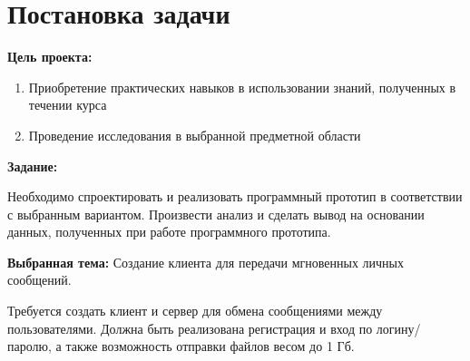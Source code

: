 \section{Постановка задачи}

{\bfseries Цель проекта:} 

\begin{enumerate}
    \item Приобретение практических навыков в использовании знаний, полученных в течении курса
    \item Проведение исследования в выбранной предметной области
\end{enumerate}

{\bfseries Задание:} 

Необходимо спроектировать и реализовать программный прототип в соответствии с
выбранным вариантом. Произвести анализ и сделать вывод на основании данных,
полученных при работе программного прототипа.

{\bfseries Выбранная тема:} Создание клиента для передачи мгновенных личных сообщений.

Требуется создать клиент и сервер для обмена сообщениями между пользователями. Должна быть реализована регистрация и вход по логину/паролю, а также возможность отправки файлов весом до 1 Гб.

\pagebreak
